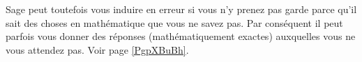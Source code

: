 Sage peut toutefois vous induire en erreur si vous n'y prenez pas garde parce qu'il sait des choses en mathématique que vous ne savez pas. Par conséquent il peut parfois vous donner des réponses (mathématiquement exactes) auxquelles vous ne vous attendez pas. Voir page \ref{PgpXBuBh}.


